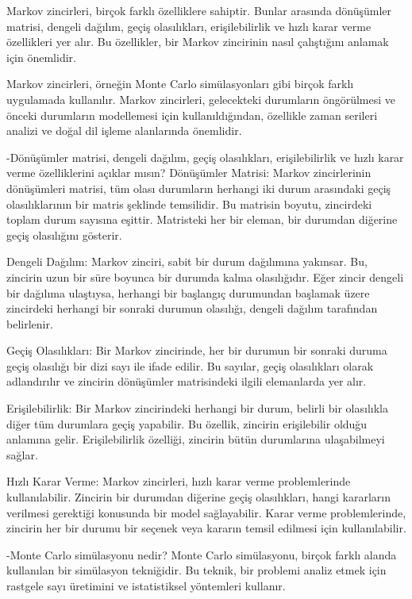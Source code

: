 \documentclass[11pt]{article}
\begin{document}
Markov zincirleri, birçok farklı özelliklere sahiptir. Bunlar arasında dönüşümler matrisi, dengeli dağılım, geçiş olasılıkları, erişilebilirlik ve hızlı karar verme özellikleri yer alır. Bu özellikler, bir Markov zincirinin nasıl çalıştığını anlamak için önemlidir.

Markov zincirleri, örneğin Monte Carlo simülasyonları gibi birçok farklı uygulamada kullanılır. Markov zincirleri, gelecekteki durumların öngörülmesi ve önceki durumların modellemesi için kullanıldığından, özellikle zaman serileri analizi ve doğal dil işleme alanlarında önemlidir.

-Dönüşümler matrisi, dengeli dağılım, geçiş olasılıkları, erişilebilirlik ve hızlı karar verme özelliklerini açıklar mısın?
Dönüşümler Matrisi: Markov zincirlerinin dönüşümleri matrisi, tüm olası durumların herhangi iki durum arasındaki geçiş olasılıklarının bir matris şeklinde temsilidir. Bu matrisin boyutu, zincirdeki toplam durum sayısına eşittir. Matristeki her bir eleman, bir durumdan diğerine geçiş olasılığını gösterir.

Dengeli Dağılım: Markov zinciri, sabit bir durum dağılımına yakınsar. Bu, zincirin uzun bir süre boyunca bir durumda kalma olasılığıdır. Eğer zincir dengeli bir dağılıma ulaştıysa, herhangi bir başlangıç durumundan başlamak üzere zincirdeki herhangi bir sonraki durumun olasılığı, dengeli dağılım tarafından belirlenir.

Geçiş Olasılıkları: Bir Markov zincirinde, her bir durumun bir sonraki duruma geçiş olasılığı bir dizi sayı ile ifade edilir. Bu sayılar, geçiş olasılıkları olarak adlandırılır ve zincirin dönüşümler matrisindeki ilgili elemanlarda yer alır.

Erişilebilirlik: Bir Markov zincirindeki herhangi bir durum, belirli bir olasılıkla diğer tüm durumlara geçiş yapabilir. Bu özellik, zincirin erişilebilir olduğu anlamına gelir. Erişilebilirlik özelliği, zincirin bütün durumlarına ulaşabilmeyi sağlar.

Hızlı Karar Verme: Markov zincirleri, hızlı karar verme problemlerinde kullanılabilir. Zincirin bir durumdan diğerine geçiş olasılıkları, hangi kararların verilmesi gerektiği konusunda bir model sağlayabilir. Karar verme problemlerinde, zincirin her bir durumu bir seçenek veya kararın temsil edilmesi için kullanılabilir.

-Monte Carlo simülasyonu nedir?
Monte Carlo simülasyonu, birçok farklı alanda kullanılan bir simülasyon tekniğidir. Bu teknik, bir problemi analiz etmek için rastgele sayı üretimini ve istatistiksel yöntemleri kullanır.
\end{document}
